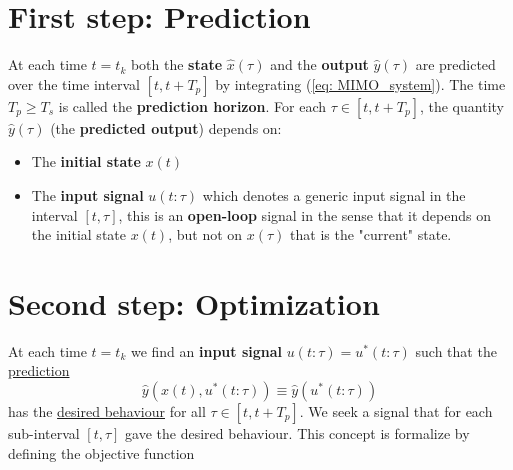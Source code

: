 \section{First step: Prediction}
At each time $t=t_k$ both the \textbf{state} $\hat{x}(\tau)$ and the \textbf{output} $\hat{y}(\tau)$ are predicted over the time interval $[t, t+T_p]$ by integrating (\ref{eq: MIMO_system}). The time $T_p \ge T_s$ is called the \textbf{prediction horizon}. For each $\tau\in [t,t+T_p]$, the quantity $\hat{y}(\tau)$ (the \textbf{predicted output}) depends on:
\begin{itemize}
    \item The \textbf{initial state} $x(t)$
    \item The \textbf{input signal} $u(t:\tau)$ which denotes a generic input signal in the interval $[t, \tau]$, this is an \textbf{open-loop} signal in the sense that it depends on the initial state $x(t)$, but not on $x(\tau)$ that is the "current" state.
\end{itemize}

\section{Second step: Optimization}
At each time $t=t_k$ we find an \textbf{input signal} $u(t:\tau)=u^*(t:\tau)$ such that the \underline{prediction}  
$$
    \hat{y}(x(t), u^*(t:\tau))\equiv \hat{y}(u^*(t:\tau))
$$
has the \underline{desired behaviour} for all $\tau \in [t, t+T_p]$. We seek a signal that for each sub-interval $[t,\tau]$ gave the desired behaviour. This concept is formalize by defining the objective function   \\

\hspace*{-5mm}
%


